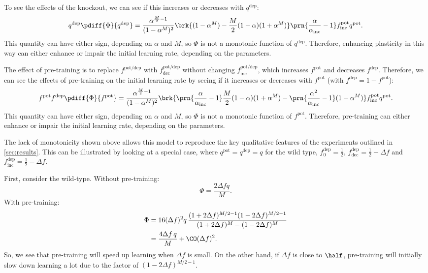 \documentclass[10pt]{article}
\newcommand{\pot}{^{\text{pot}}}
\newcommand{\dep}{^{\text{dep}}}
\newcommand{\potdep}{^{\text{pot/dep}}}
\newcommand{\inc}{_{\text{inc}}}
\newcommand{\dec}{_{\text{dec}}}
\begin{document}
To see the effects of the knockout, we can see if this increases or decreases with $q\dep$:
%
\begin{equation}\label{eq:serialderq}
  q\dep \pdiff{\Phi}{q\dep} =
    \frac{\alpha^{\frac{M}{2} - 1}}{(1 - \alpha^M)^2}
    \brk{(1 - \alpha^M) - \frac{M}{2} (1 - \alpha) (1 + \alpha^M) }
    \prn{\frac{\alpha}{\alpha\inc} - 1} f\inc\pot  q\pot.
\end{equation}
%
This quantity can have either sign, depending on $\alpha$ and $M$, so $\Phi$ is not a monotonic function of $q\dep$.
Therefore, enhancing plasticity in this way can either enhance or impair the initial learning rate, depending on the parameters.

The effect of pre-training is to replace $f\potdep$ with $f\potdep\dec$ without changing $f\potdep\inc$, which increases $f\pot$ and decreases $f\dep$.
Therefore, we can see the effects of pre-training on the initial learning rate by seeing if it increases or decreases with $f\pot$ (with $f\dep = 1 - f\pot$):
%
\begin{equation}\label{eq:serialderf}
  f\pot f\dep \pdiff{\Phi}{f\pot} =
    \frac{\alpha^{\frac{M}{2} - 1}}{(1 - \alpha^M)^2}
      \brk{ \prn{\frac{\alpha}{\alpha\inc} - 1} \frac{M}{2} (1 - \alpha) (1 + \alpha^M)
      - \prn{\frac{\alpha^2}{\alpha\inc} - 1} (1 - \alpha^M) }
      f\inc\pot  q\pot.
\end{equation}
%
This quantity can have either sign, depending on $\alpha$ and $M$, so $\Phi$ is not a monotonic function of $f\pot$.
Therefore, pre-training can either enhance or impair the initial learning rate, depending on the parameters.

The lack of monotonicity shown above allows this model to reproduce the key qualitative features of the experiments outlined in \autoref{sec:results}.
This can be illustrated by looking at a special case, where $q\pot = q\dep = q$ for the wild type, $f\dep_0 = \frac{1}{2}$, $f\dep\dec = \frac{1}{2} - \Delta f$ and $f\dep\inc = \frac{1}{2} - \Delta f$.


First, consider the wild-type.
Without pre-training:
%
\begin{equation}\label{eq:multiWTnopre}
  \Phi = \frac{2{\Delta f}q}{M}.
\end{equation}
%
With pre-training:
%
\begin{equation}\label{eq:multiWTpre}
\begin{aligned}
  \Phi &= 16(\Delta f)^2q \, \frac{(1+2\Delta f)^{M/2-1} (1-2\Delta f)^{M/2-1}}
          {(1+2\Delta f)^M - (1-2\Delta f)^M} \\
       &= \frac{4{\Delta f}\,q}{M} + \CO(\Delta f)^2.
\end{aligned}
\end{equation}
%
So, we see that pre-training will speed up learning when $\Delta f$ is small.
On the other hand, if $\Delta f$ is close to $\half$, pre-training will initially slow down learning a lot due to the factor of $(1-2\Delta f)^{M/2-1}$.
\end{document}
